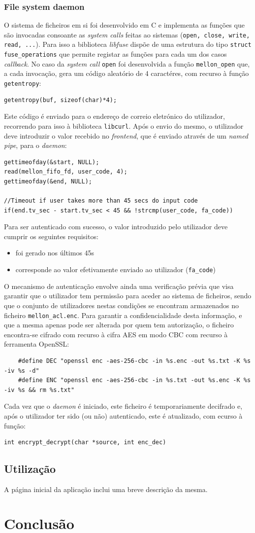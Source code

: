 \documentclass{article}
\begin{document}
\subsubsection{File system daemon}
O sistema de ficheiros em si foi desenvolvido em C e implementa as funções que são invocadas consoante as \textit{system calls} feitas ao sistemas 
(\texttt{open, close, write, read, ...}). Para isso a biblioteca \textit{libfuse} dispõe de uma estrutura do tipo \texttt{struct
fuse\_operations} que permite registar as funções para cada um dos casos \textit{callback}. No caso da \textit{system call} \texttt{open} foi 
desenvolvida a função \texttt{mellon\_open} que, a cada invocação, gera um código aleatório de 4 caractéres, com recurso à função \texttt{getentropy}:
\begin{Verbatim}
getentropy(buf, sizeof(char)*4);
\end{Verbatim}
Este código é enviado para o endereço de correio eletrónico do utilizador, recorrendo para isso à biblioteca \texttt{libcurl}.
Após o envio do mesmo, o utilizador deve introduzir o valor recebido no \textit{frontend}, que é enviado através de um \textit{named pipe}, para o 
\textit{daemon}:
\begin{Verbatim}
gettimeofday(&start, NULL);
read(mellon_fifo_fd, user_code, 4);
gettimeofday(&end, NULL);

//Timeout if user takes more than 45 secs do input code
if(end.tv_sec - start.tv_sec < 45 && !strcmp(user_code, fa_code))
\end{Verbatim}
Para ser autenticado com sucesso, o valor introduzido pelo utilizador deve cumprir os seguintes requisitos:
\begin{itemize}
    \item foi gerado nos últimos 45s
    \item corresponde ao valor efetivamente enviado ao utilizador (\texttt{fa\_code})
\end{itemize}

O mecanismo de autenticação envolve ainda uma verificação prévia que visa garantir que o utilizador 
tem permissão para aceder ao sistema de ficheiros, sendo que o conjunto de utilizadores nestas condições
se encontram armazenados no ficheiro \texttt{mellon\_acl.enc}.
Para garantir a confidencialidade desta informação, e que a mesma apenas pode ser alterada por quem tem autorização,
o ficheiro encontra-se cifrado com recurso à cifra AES em modo CBC com recurso à ferramenta OpenSSL:
\begin{Verbatim}
    #define DEC "openssl enc -aes-256-cbc -in %s.enc -out %s.txt -K %s -iv %s -d"
    #define ENC "openssl enc -aes-256-cbc -in %s.txt -out %s.enc -K %s -iv %s && rm %s.txt"
\end{Verbatim}
Cada vez que o \textit{daemon} é iniciado, este ficheiro é temporariamente decifrado e, após o utilizador ter sido (ou não)
autenticado, este é atualizado, com ecurso à função:
\begin{Verbatim}
int encrypt_decrypt(char *source, int enc_dec)
\end{Verbatim}

\subsection{Utilização}
A página inicial da aplicação inclui uma breve descrição da mesma.
\section{Conclusão}
\end{document}

